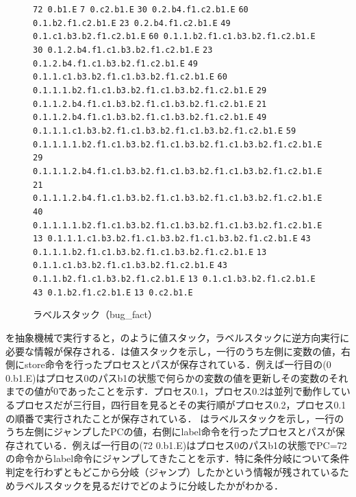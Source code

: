 \documentclass[submit,PRO]{ipsj}
\def\|{\verb|}
\begin{document}
\begin{figure}[tb]
\vbox{
\hbox{\|72 0.b1.E|}
\hbox{\|7 0.c2.b1.E|}
\hbox{\|30 0.2.b4.f1.c2.b1.E|}
\hbox{\|60 0.1.b2.f1.c2.b1.E|}
\hbox{\|23 0.2.b4.f1.c2.b1.E|}
\hbox{\|49 0.1.c1.b3.b2.f1.c2.b1.E|}
\hbox{\|60 0.1.1.b2.f1.c1.b3.b2.f1.c2.b1.E|}
\hbox{\|30 0.1.2.b4.f1.c1.b3.b2.f1.c2.b1.E|}
\hbox{\|23 0.1.2.b4.f1.c1.b3.b2.f1.c2.b1.E|}
\hbox{\|49 0.1.1.c1.b3.b2.f1.c1.b3.b2.f1.c2.b1.E|}
\hbox{\|60 0.1.1.1.b2.f1.c1.b3.b2.f1.c1.b3.b2.f1.c2.b1.E|}
\hbox{\|29 0.1.1.2.b4.f1.c1.b3.b2.f1.c1.b3.b2.f1.c2.b1.E|}
\hbox{\|21 0.1.1.2.b4.f1.c1.b3.b2.f1.c1.b3.b2.f1.c2.b1.E|}
\hbox{\|49 0.1.1.1.c1.b3.b2.f1.c1.b3.b2.f1.c1.b3.b2.f1.c2.b1.E|}
\hbox{\|59 0.1.1.1.1.b2.f1.c1.b3.b2.f1.c1.b3.b2.f1.c1.b3.b2.f1.c2.b1.E|}
\hbox{\|29 0.1.1.1.2.b4.f1.c1.b3.b2.f1.c1.b3.b2.f1.c1.b3.b2.f1.c2.b1.E|}
\hbox{\|21 0.1.1.1.2.b4.f1.c1.b3.b2.f1.c1.b3.b2.f1.c1.b3.b2.f1.c2.b1.E|}
\hbox{\|40 0.1.1.1.1.b2.f1.c1.b3.b2.f1.c1.b3.b2.f1.c1.b3.b2.f1.c2.b1.E|}
\hbox{\|13 0.1.1.1.c1.b3.b2.f1.c1.b3.b2.f1.c1.b3.b2.f1.c2.b1.E|}
\hbox{\|43 0.1.1.1.b2.f1.c1.b3.b2.f1.c1.b3.b2.f1.c2.b1.E|}
\hbox{\|13 0.1.1.c1.b3.b2.f1.c1.b3.b2.f1.c2.b1.E|}
\hbox{\|43 0.1.1.b2.f1.c1.b3.b2.f1.c2.b1.E|}
\hbox{\|13 0.1.c1.b3.b2.f1.c2.b1.E|}
\hbox{\|43 0.1.b2.f1.c2.b1.E|}
\hbox{\|13 0.c2.b1.E|}
}
\centerline{}
\caption{ラベルスタック（bug\_fact）}
\label{fig:label}
\end{figure}



を抽象機械で実行すると，のように値スタック，ラベルスタックに逆方向実行に必要な情報が保存される．は値スタックを示し，一行のうち左側に変数の値，右側にstore命令を行ったプロセスとパスが保存されている．例えば一行目の(0 0.b1.E)はプロセス0のパスb1の状態で何らかの変数の値を更新しその変数のそれまでの値が0であったことを示す．プロセス0.1，プロセス0.2は並列で動作しているプロセスだが三行目，四行目を見るとその実行順がプロセス0.2，プロセス0.1の順番で実行されたことが保存されている．
はラベルスタックを示し，一行のうち左側にジャンプしたPCの値，右側にlabel命令を行ったプロセスとパスが保存されている．例えば一行目の(72 0.b1.E)はプロセス0のパスb1の状態でPC=72の命令からlabel命令にジャンプしてきたことを示す．特に条件分岐について条件判定を行わずともどこから分岐（ジャンプ）したかという情報が残されているためラベルスタックを見るだけでどのように分岐したかがわかる．
\end{document}
